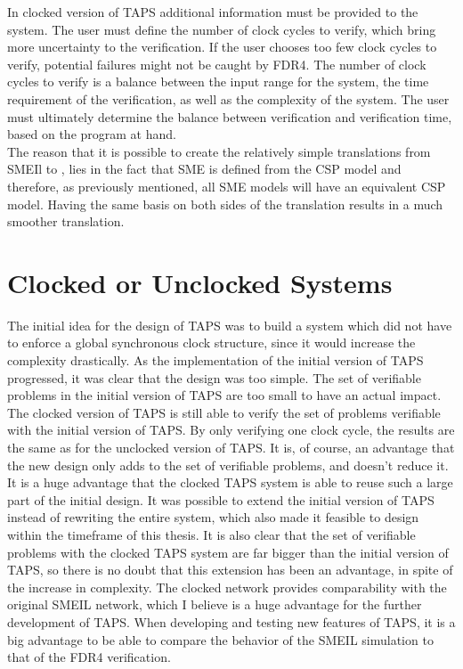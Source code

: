In clocked version of TAPS additional information must be provided to the system. The user must define the number of clock cycles to verify, which bring more uncertainty to the verification. If the user chooses too few clock cycles to verify, potential failures might not be caught by FDR4. The number of clock cycles to verify is a balance between the input range for the system, the time requirement of the verification, as well as the complexity of the system.
The user must ultimately determine the balance between verification and verification time, based on the program at hand. \\

The reason that it is possible to create the relatively simple translations from SMEIl to \cspm{}, lies in the fact that SME is defined from the CSP model and therefore, as previously mentioned, all SME models will have an equivalent CSP model. Having the same basis on both sides of the translation results in a much smoother translation.

\section{Clocked or Unclocked \cspm{} Systems}
The initial idea for the design of TAPS was to build a system which did not have to enforce a global synchronous clock structure, since it would increase the complexity drastically. As the implementation of the initial version of TAPS progressed, it was clear that the design was too simple. The set of verifiable problems in the initial version of TAPS are too small to have an actual impact.
The clocked version of TAPS is still able to verify the set of problems verifiable with the initial version of TAPS. By only verifying one clock cycle, the results are the same as for the unclocked version of TAPS.
It is, of course, an advantage that the new design only adds to the set of verifiable problems, and doesn't reduce it.\\

It is a huge advantage that the clocked TAPS system is able to reuse such a large part of the initial design. It was possible to extend the initial version of TAPS instead of rewriting the entire system, which also made it feasible to design within the timeframe of this thesis.
It is also clear that the set of verifiable problems with the clocked TAPS system are far bigger than the initial version of TAPS, so there is no doubt that this extension has been an advantage, in spite of the increase in complexity.
The clocked \cspm{} network provides comparability with the original SMEIL network, which I believe is a huge advantage for the further development of TAPS. When developing and testing new features of TAPS, it is a big advantage to be able to compare the behavior of the SMEIL simulation to that of the FDR4 verification. \\

